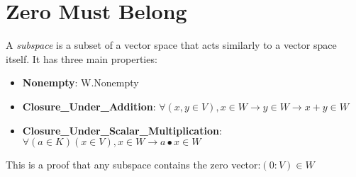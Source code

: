 \section{Zero Must Belong}


\begin{definition}
  \label{definition : Subspace}
  \leanok
  A \emph{subspace} is a subset of a vector space that acts similarly to a vector space itself. It has three main properties:
  \begin{itemize}
    \item \textbf{Nonempty}:
    W.Nonempty
    \item \textbf{Closure\_Under\_Addition}:
    $\forall (x, y \in V), x ∈ W \rightarrow y \in W \rightarrow x + y \in W$
    \item \textbf{Closure\_Under\_Scalar\_Multiplication}:
    $\forall (a \in K) (x \in V), x \in W \rightarrow a \bullet x \in W$
  \end{itemize}
\end{definition}

\begin{theorem}
  \label{theorem : subspace_contains_zero}
  \leanok
  This is a proof that any subspace contains the zero vector:$(0 : V) \in W$
\end{theorem}
